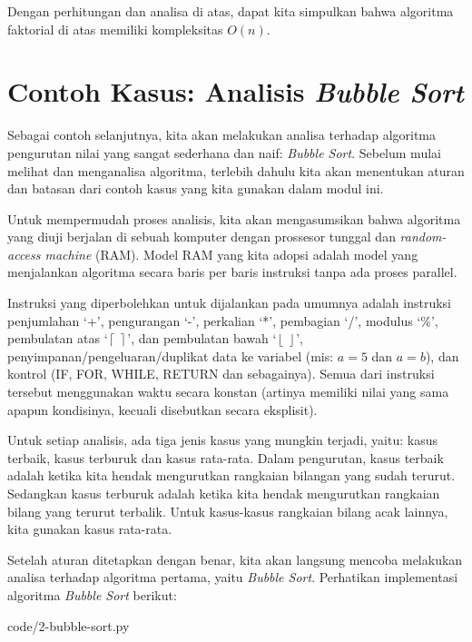 Dengan perhitungan dan analisa di atas, dapat kita simpulkan bahwa algoritma faktorial di atas memiliki kompleksitas $O(n)$.

\section{Contoh Kasus: Analisis \textit{Bubble Sort}}

Sebagai contoh selanjutnya, kita akan melakukan analisa terhadap algoritma pengurutan nilai yang sangat sederhana dan naif: \textit{Bubble Sort}. Sebelum mulai melihat dan menganalisa algoritma, terlebih dahulu kita akan menentukan aturan dan batasan dari contoh kasus yang kita gunakan dalam modul ini.

Untuk mempermudah proses analisis, kita akan mengasumsikan bahwa algoritma yang diuji berjalan di sebuah komputer dengan prossesor tunggal dan \textit{random-access machine} (RAM). Model RAM yang kita adopsi adalah model yang menjalankan algoritma secara baris per baris instruksi tanpa ada proses parallel. 

Instruksi yang diperbolehkan untuk dijalankan pada umumnya adalah instruksi penjumlahan `+', pengurangan `-', perkalian `*', pembagian `/', modulus `\%', pembulatan atas `$\left\lceil\  \right\rceil$', dan pembulatan bawah `$\left\lfloor\ \right\rfloor$', penyimpanan/pengeluaran/duplikat data ke variabel (mis: $a = 5$ dan $a = b$), dan kontrol (IF, FOR, WHILE, RETURN dan sebagainya). Semua dari instruksi tersebut menggunakan waktu secara konstan (artinya memiliki nilai yang sama apapun kondisinya, kecuali disebutkan secara eksplisit).

Untuk setiap analisis, ada tiga jenis kasus yang mungkin terjadi, yaitu: kasus terbaik, kasus terburuk dan kasus rata-rata. Dalam pengurutan, kasus terbaik adalah ketika kita hendak mengurutkan rangkaian bilangan yang sudah terurut. Sedangkan kasus terburuk adalah ketika kita hendak mengurutkan rangkaian bilang yang terurut terbalik. Untuk kasus-kasus rangkaian bilang acak lainnya, kita gunakan kasus rata-rata.

Setelah aturan ditetapkan dengan benar, kita akan langsung mencoba melakukan analisa terhadap algoritma pertama, yaitu \textit{Bubble Sort}. Perhatikan implementasi algoritma \textit{Bubble Sort} berikut:


                {code/2-bubble-sort.py}

